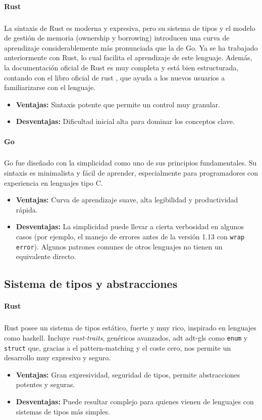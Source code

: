 \paragraph{Rust}
\subparagraph{}
La sintaxis de Rust es moderna y expresiva, pero su sistema de tipos y el modelo de gestión de memoria (ownership y borrowing) introducen una curva de aprendizaje considerablemente más pronunciada que la de Go.
Ya se ha trabajado anteriormente con Rust, lo cual facilita el aprendizaje de este lenguaje.
Además, la documentación oficial de Rust es muy completa y está bien estructurada, contando con el libro oficial de rust \parencite{rustbook2024}, que ayuda a los nuevos usuarios a familiarizarse con el lenguaje.
\begin{itemize}
    \item \textbf{Ventajas:} Sintaxis potente que permite un control muy granular.
    \item \textbf{Desventajas:} Dificultad inicial alta para dominar los conceptos clave.
\end{itemize}

\paragraph{Go}
\subparagraph{}

Go fue diseñado con la simplicidad como uno de sus principios fundamentales. Su sintaxis es minimalista y fácil de aprender, especialmente para programadores con experiencia en lenguajes tipo C.
\begin{itemize}
    \item \textbf{Ventajas:} Curva de aprendizaje suave, alta legibilidad y productividad rápida.
    \item \textbf{Desventajas:} La simplicidad puede llevar a cierta verbosidad en algunos casos (por ejemplo, el manejo de errores antes de la versión 1.13 con \texttt{wrap error}). Algunos patrones comunes de otros lenguajes no tienen un equivalente directo.
\end{itemize}

\subsection{Sistema de tipos y abstracciones}
\paragraph{Rust}
\subparagraph{}

Rust posee un sistema de tipos estático, fuerte y muy rico, inspirado en lenguajes como \gls{haskell}. Incluye \textit{\gls{rust-traits}}, genéricos avanzados, \acrlong{adt} \gls{adt-gls} como \texttt{enum} y \texttt{struct} que, gracias a el \gls{pattern-matching} y el coste cero, nos permite un desarrollo muy expresivo y seguro.
\begin{itemize}
    \item \textbf{Ventajas:} Gran expresividad, seguridad de tipos, permite abstracciones potentes y seguras.
    \item \textbf{Desventajas:} Puede resultar complejo para quienes vienen de lenguajes con sistemas de tipos más simples.
\end{itemize}

